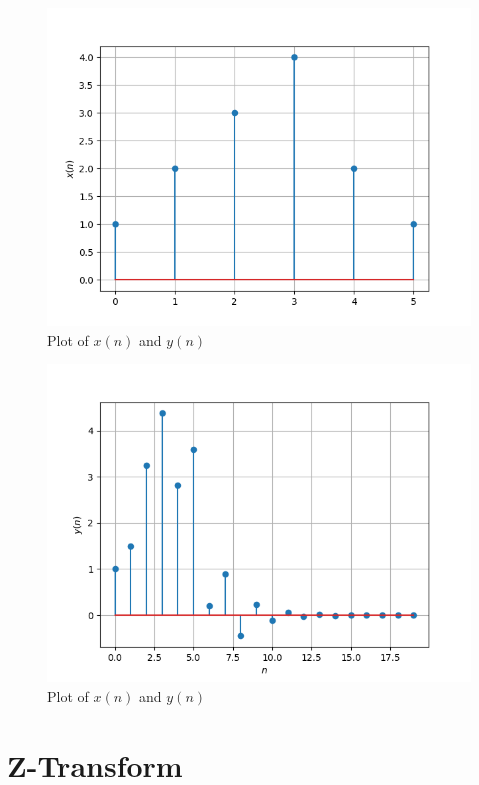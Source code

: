 \documentclass[journal,12pt,twocolumn]{IEEEtran}
\theoremstyle{remark}
\begin{document}
\begin{enumerate}
\begin{figure}[H]
	\centering
	\includegraphics[width=\columnwidth]{figs/Plot_xn.png}
	\caption{Plot of $x(n)$ and $y(n)$}
	\label{xnyn.46}
\end{figure}
\begin{figure}[H]
	\centering
	\includegraphics[width=\columnwidth]{figs/Plot_yn.png}
	\caption{Plot of $x(n)$ and $y(n)$}
	\label{xnyn.46}
\end{figure}
\end{enumerate}

\section{Z-Transform}
\end{document}
